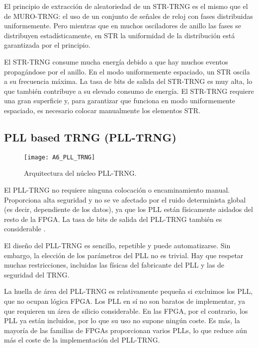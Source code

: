                 El principio de extracción de aleatoriedad de un STR-TRNG es el mismo que el de MURO-TRNG: el uso de un conjunto de señales de reloj con fases distribuidas uniformemente. Pero mientras que en muchos osciladores de anillo las fases se distribuyen estadísticamente, en STR la uniformidad de la distribución está garantizada por el principio. 

                El STR-TRNG consume mucha energía debido a que hay muchos eventos propagándose por el anillo. En el modo uniformemente espaciado, un STR oscila a su frecuencia máxima. La tasa de bits de salida del STR-TRNG es muy alta, lo que también contribuye a su elevado consumo de energía. El STR-TRNG requiere una gran superficie y, para garantizar que funciona en modo uniformemente espaciado, es necesario colocar manualmente los elementos STR.
				
				
		\subsection{PLL based TRNG (PLL-TRNG)}
				
				\begin{figure}[hbtp]
					\centering
					\texttt{[image: A6\_PLL\_TRNG]}
					\caption{Arquitectura del núcleo PLL-TRNG.}
					\label{fig:A6_PLL_TRNG}
				\end{figure}

                El PLL-TRNG no requiere ninguna colocación o encaminamiento manual. Proporciona alta seguridad y no se ve afectado por el ruido determinista global (es decir, dependiente de los datos), ya que los PLL están físicamente aislados del resto de la FPGA. La tasa de bits de salida del PLL-TRNG también es considerable \cite{Fischer2019}.

                El diseño del PLL-TRNG es sencillo, repetible y puede automatizarse. Sin embargo, la elección de los parámetros del PLL no es trivial. Hay que respetar muchas restricciones, incluidas las físicas del fabricante del PLL  y las de seguridad del TRNG. 

                La huella de área del PLL-TRNG es relativamente pequeña si excluimos los PLL, que no ocupan lógica FPGA. Los PLL en sí no son baratos de implementar, ya que requieren un área de silicio considerable. En las FPGA, por el contrario, los PLL ya están incluidos, por lo que su uso no supone ningún coste. Es más, la mayoría de las familias de FPGAs proporcionan varios PLLs, lo que reduce aún más el coste de la implementación del PLL-TRNG.

